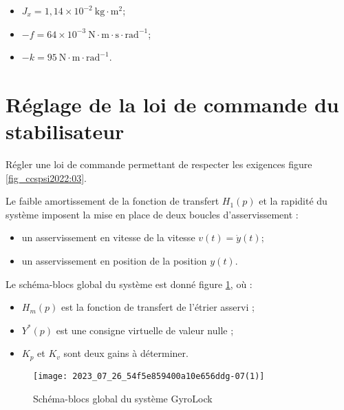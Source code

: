 \begin{itemize}
  \item $J_{x}=1,14 \times 10^{-2} \mathrm{~kg} \cdot \mathrm{m}^{2}$;

  \item $-f=64 \times 10^{-3} \mathrm{~N} \cdot \mathrm{m} \cdot \mathrm{s} \cdot \mathrm{rad}^{-1}$;

  \item $-k=95 \mathrm{~N} \cdot \mathrm{m} \cdot \mathrm{rad}^{-1}$.
\end{itemize}


\section{Réglage de la loi de commande du stabilisateur}
\begin{obj}
Régler une loi de commande permettant de respecter les exigences figure \ref{fig_ccspsi2022:03}.
\end{obj}

Le faible amortissement de la fonction de transfert $H_{1}(p)$ et la rapidité du système imposent la mise en place de deux boucles d'asservissement :
\begin{itemize}
 \item  un asservissement en vitesse de la vitesse $v(t)=\dot{y}(t)$;
  \item un asservissement en position de la position $y(t)$.
\end{itemize}

Le schéma-blocs global du système est donné figure \ref{fig_ccspsi2022:11}, où :

\begin{itemize}
  \item $H_{m}(p)$ est la fonction de transfert de l'étrier asservi ;

  \item $Y^{*}(p)$ est une consigne virtuelle de valeur nulle ;

  \item $K_{p}$ et $K_{v}$ sont deux gains à déterminer.

\end{itemize}


\begin{figure}[!h]
\centering
\texttt{[image: 2023\_07\_26\_54f5e859400a10e656ddg-07(1)]}
\caption{\label{fig_ccspsi2022:11}Schéma-blocs global du système GyroLock}
\end{figure}

